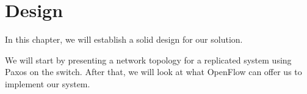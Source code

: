\chapter{Design}
\label{chapter:design}

In this chapter, we will establish a solid design for our solution.

We will start by presenting a network topology for a replicated system using
Paxos on the switch.  After that, we will look at what OpenFlow can offer us
to implement our system.



